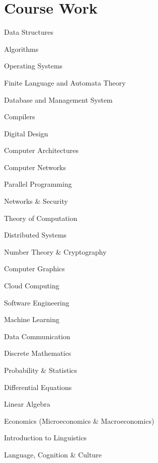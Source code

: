 \section{Course Work}
\begin{multicols}{2}
\skiplocation
\begin{tightemize}
	\item Data Structures
	\item Algorithms
	\item Operating Systems
	\item Finite Language and Automata Theory
	\item Database and Management System 
	\item Compilers
	\item Digital Design
	\item Computer Architectures
	\item Computer Networks
\end{tightemize}
\sectionsep

\skiplocation
\begin{tightemize}
	\item Parallel Programming
	\item Networks \& Security
	\item Theory of Computation
	\item Distributed Systems
	\item Number Theory \& Cryptography

\end{tightemize}
\sectionsep

	\columnbreak

\skiplocation
\begin{tightemize}
	\item Computer Graphics
	\item Cloud Computing
	\item Software Engineering
	\item Machine Learning
	\item Data Communication	
\end{tightemize}
\sectionsep

\skiplocation
\begin{tightemize}
	\item Discrete Mathematics
	\item Probability \& Statistics
	\item Differential Equations
	\item Linear Algebra
\end{tightemize}
\sectionsep

\skiplocation
\begin{tightemize}
	\item Economics (Microeconomics \& Macroeconomics)
	\item Introduction to Linguistics
	\item Language, Cognition \& Culture 
\end{tightemize}
\sectionsep

\end{multicols}